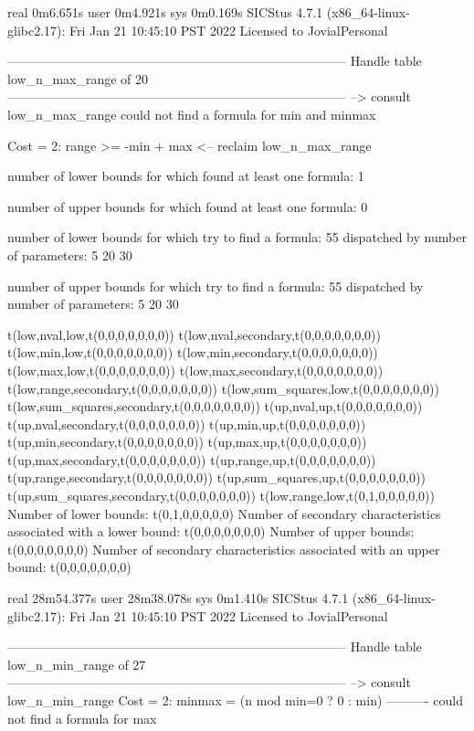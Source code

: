 real	0m6.651s
user	0m4.921s
sys	0m0.169s
SICStus 4.7.1 (x86_64-linux-glibc2.17): Fri Jan 21 10:45:10 PST 2022
Licensed to JovialPersonal


--------------------------------------------------------------------------------
Handle table low_n_max_range of 20
--------------------------------------------------------------------------------
--> consult low_n_max_range
could not find a formula for min and minmax

Cost =  2:  range >= -min + max
<-- reclaim low_n_max_range

number of lower bounds for which found at least one formula: 1

number of upper bounds for which found at least one formula: 0

number of lower bounds for which try to find a formula: 55
dispatched by number of parameters: 5  20  30

number of upper bounds for which try to find a formula: 55
dispatched by number of parameters: 5  20  30

t(low,nval,low,t(0,0,0,0,0,0,0))
t(low,nval,secondary,t(0,0,0,0,0,0,0))
t(low,min,low,t(0,0,0,0,0,0,0))
t(low,min,secondary,t(0,0,0,0,0,0,0))
t(low,max,low,t(0,0,0,0,0,0,0))
t(low,max,secondary,t(0,0,0,0,0,0,0))
t(low,range,secondary,t(0,0,0,0,0,0,0))
t(low,sum_squares,low,t(0,0,0,0,0,0,0))
t(low,sum_squares,secondary,t(0,0,0,0,0,0,0))
t(up,nval,up,t(0,0,0,0,0,0,0))
t(up,nval,secondary,t(0,0,0,0,0,0,0))
t(up,min,up,t(0,0,0,0,0,0,0))
t(up,min,secondary,t(0,0,0,0,0,0,0))
t(up,max,up,t(0,0,0,0,0,0,0))
t(up,max,secondary,t(0,0,0,0,0,0,0))
t(up,range,up,t(0,0,0,0,0,0,0))
t(up,range,secondary,t(0,0,0,0,0,0,0))
t(up,sum_squares,up,t(0,0,0,0,0,0,0))
t(up,sum_squares,secondary,t(0,0,0,0,0,0,0))
t(low,range,low,t(0,1,0,0,0,0,0))
Number of lower bounds:                                             t(0,1,0,0,0,0,0)
Number of secondary characteristics associated with a lower bound:  t(0,0,0,0,0,0,0)
Number of upper bounds:                                             t(0,0,0,0,0,0,0)
Number of secondary characteristics associated with an upper bound: t(0,0,0,0,0,0,0)

real	28m54.377s
user	28m38.078s
sys	0m1.410s
SICStus 4.7.1 (x86_64-linux-glibc2.17): Fri Jan 21 10:45:10 PST 2022
Licensed to JovialPersonal


--------------------------------------------------------------------------------
Handle table low_n_min_range of 27
--------------------------------------------------------------------------------
--> consult low_n_min_range
Cost =  2:  minmax = (n mod min=0 ? 0 : min)
----------
could not find a formula for max

